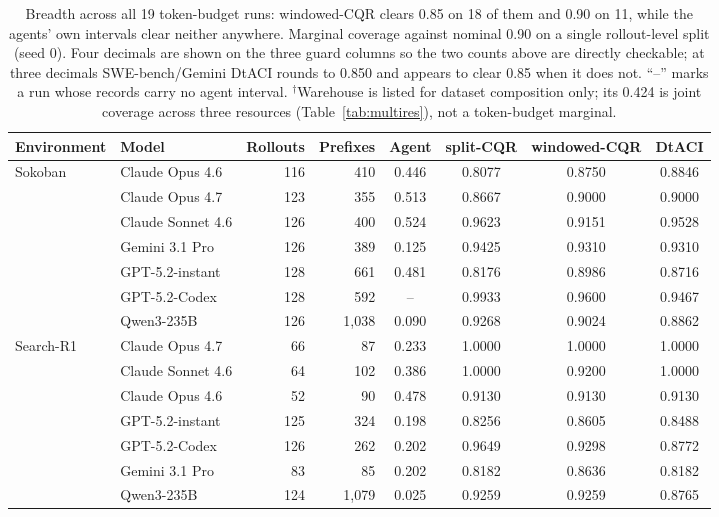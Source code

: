 \documentclass{article}
\begin{document}
\begin{table}[t]
  \caption{Breadth across all 19 token-budget runs: windowed-CQR clears 0.85 on 18 of
  them and 0.90 on 11, while the agents' own intervals clear neither anywhere. Marginal
  coverage against nominal 0.90 on a single rollout-level split (seed 0). Four decimals are shown on the three guard
  columns so the two counts above are directly checkable; at three decimals
  SWE-bench/Gemini DtACI rounds to 0.850 and appears to clear 0.85 when it does not.
  ``--'' marks a run whose records carry no agent interval. $^{\dagger}$Warehouse is
  listed for dataset composition only; its 0.424 is joint coverage across three
  resources (Table~\ref{tab:multires}), not a token-budget marginal.}
  \label{tab:b1}
  \centering
  \footnotesize
  \begin{tabular}{llrrcccc}
    \toprule
    Environment & Model & Rollouts & Prefixes & Agent & split-CQR & windowed-CQR & DtACI \\
    \midrule
    Sokoban & Claude Opus 4.6 & 116 & 410 & 0.446 & 0.8077 & 0.8750 & 0.8846 \\
     & Claude Opus 4.7 & 123 & 355 & 0.513 & 0.8667 & 0.9000 & 0.9000 \\
     & Claude Sonnet 4.6 & 126 & 400 & 0.524 & 0.9623 & 0.9151 & 0.9528 \\
     & Gemini 3.1 Pro & 126 & 389 & 0.125 & 0.9425 & 0.9310 & 0.9310 \\
     & GPT-5.2-instant & 128 & 661 & 0.481 & 0.8176 & 0.8986 & 0.8716 \\
     & GPT-5.2-Codex & 128 & 592 & -- & 0.9933 & 0.9600 & 0.9467 \\
     & Qwen3-235B & 126 & 1{,}038 & 0.090 & 0.9268 & 0.9024 & 0.8862 \\
    \midrule
    Search-R1 & Claude Opus 4.7 & 66 & 87 & 0.233 & 1.0000 & 1.0000 & 1.0000 \\
     & Claude Sonnet 4.6 & 64 & 102 & 0.386 & 1.0000 & 0.9200 & 1.0000 \\
     & Claude Opus 4.6 & 52 & 90 & 0.478 & 0.9130 & 0.9130 & 0.9130 \\
     & GPT-5.2-instant & 125 & 324 & 0.198 & 0.8256 & 0.8605 & 0.8488 \\
     & GPT-5.2-Codex & 126 & 262 & 0.202 & 0.9649 & 0.9298 & 0.8772 \\
     & Gemini 3.1 Pro & 83 & 85 & 0.202 & 0.8182 & 0.8636 & 0.8182 \\
     & Qwen3-235B & 124 & 1{,}079 & 0.025 & 0.9259 & 0.9259 & 0.8765 \\

\end{tabular}
\end{table}
\end{document}
